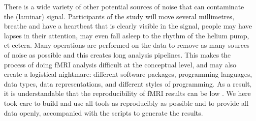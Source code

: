 There is a wide variety of other potential sources of noise that can contaminate the (laminar) signal. Participants of the study will move several millimetres, breathe and have a heartbeat that is clearly visible in the signal, people may have lapses in their attention, may even fall asleep to the rhythm of the helium pump, et cetera. Many operations are performed on the data to remove as many sources of noise as possible and this creates long analysis pipelines. This makes the process of doing fMRI analysis difficult at the conceptual level, and may also create a logistical nightmare: different software packages, programming languages, data types, data representations, and different styles of programming. As a result, it is understandable that the reproducibility of fMRI results can be low \cite{Nosek2015,Gorgolewski2016a}. We here took care to build and use all tools as reproducibly as possible and to provide all data openly, accompanied with the scripts to generate the results.













